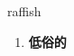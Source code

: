 
\begin{frame}
{\huge raffish}
\begin{center}
\begin{enumerate}\Large
  \item \textbf{低俗的}
\end{enumerate}
\end{center}
\end{frame}
